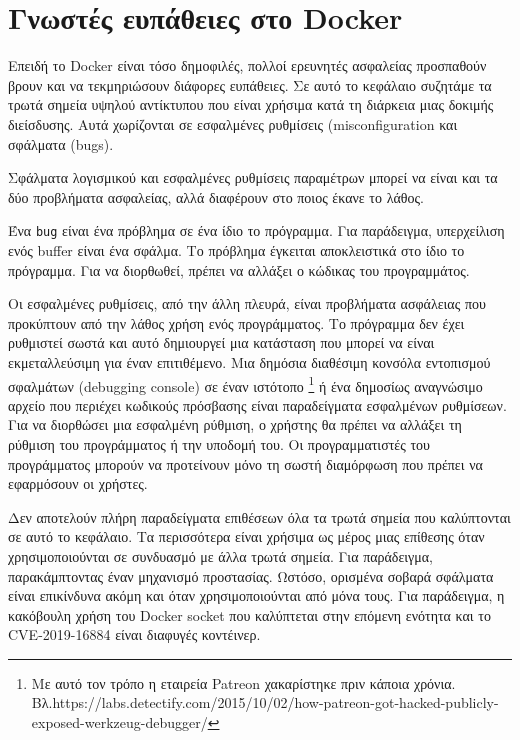 \chapter{Γνωστές ευπάθειες στο \textlatin{Docker}}
\label{knownDockerCves}

Επειδή το \textlatin{Docker} είναι τόσο δημοφιλές, πολλοί ερευνητές ασφαλείας
προσπαθούν βρουν και να τεκμηριώσουν διάφορες ευπάθειες. Σε αυτό το κεφάλαιο
συζητάμε τα τρωτά σημεία υψηλού αντίκτυπου που είναι χρήσιμα κατά τη διάρκεια
μιας δοκιμής διείσδυσης. Αυτά χωρίζονται σε εσφαλμένες ρυθμίσεις
(\textlatin{misconfiguration} και σφάλματα (\textlatin{bugs}).

Σφάλματα λογισμικού και εσφαλμένες ρυθμίσεις παραμέτρων μπορεί να είναι και τα
δύο προβλήματα ασφαλείας, αλλά διαφέρουν στο ποιος έκανε το λάθος.

Ένα \texttt{\textlatin{bug}} είναι ένα πρόβλημα σε ένα ίδιο το πρόγραμμα. Για
παράδειγμα, υπερχείλιση ενός \textlatin{buffer} είναι ένα σφάλμα. Το πρόβλημα
έγκειται αποκλειστικά στο ίδιο το πρόγραμμα. Για να διορθωθεί, πρέπει να
αλλάξει ο κώδικας του προγραμμάτος.

Οι εσφαλμένες ρυθμίσεις, από την άλλη πλευρά, είναι προβλήματα ασφάλειας που
προκύπτουν από την λάθος χρήση ενός προγράμματος. Το πρόγραμμα δεν έχει
ρυθμιστεί σωστά και αυτό δημιουργεί μια κατάσταση που μπορεί να είναι
εκμεταλλεύσιμη για έναν επιτιθέμενο. Μια δημόσια διαθέσιμη κονσόλα εντοπισμού
σφαλμάτων (\textlatin{debugging console}) σε έναν ιστότοπο 
\footnote{Με αυτό τον τρόπο η εταιρεία \textlatin{Patreon} χακαρίστηκε πριν
κάποια χρόνια. Βλ.\textlatin{https://labs.detectify.com/2015/10/02/how-patreon-got-hacked-publicly-exposed-werkzeug-debugger/}}
ή ένα δημοσίως αναγνώσιμο αρχείο που περιέχει κωδικούς πρόσβασης είναι
παραδείγματα εσφαλμένων ρυθμίσεων. Για να διορθώσει μια εσφαλμένη
ρύθμιση, ο χρήστης θα πρέπει να αλλάξει τη ρύθμιση του προγράμματος ή την
υποδομή του. Οι προγραμματιστές του προγράμματος μπορούν να προτείνουν μόνο
τη σωστή διαμόρφωση που πρέπει να εφαρμόσουν οι χρήστες.

Δεν αποτελούν πλήρη παραδείγματα επιθέσεων όλα τα τρωτά σημεία που καλύπτονται
σε αυτό το κεφάλαιο. Τα περισσότερα είναι χρήσιμα ως μέρος μιας επίθεσης όταν
χρησιμοποιούνται σε συνδυασμό με άλλα τρωτά σημεία. Για παράδειγμα,
παρακάμπτοντας έναν μηχανισμό προστασίας. Ωστόσο, ορισμένα σοβαρά σφάλματα
είναι επικίνδυνα ακόμη και όταν χρησιμοποιούνται από μόνα τους.
Για παράδειγμα, η κακόβουλη χρήση του \textlatin{Docker socket} που καλύπτεται
στην επόμενη ενότητα και το \textlatin{CVE-2019-16884} είναι διαφυγές κοντέινερ.

